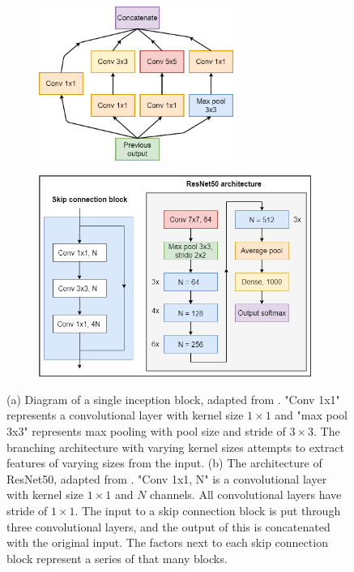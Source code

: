 \documentclass[12pt]{article}
\begin{document}
\begin{figure}[!h]
\centering
\begin{subfigure}{0.5\textwidth}
	\centering
	\hspace{-1cm}\includegraphics[width=2.5in]{images/inception_block.png}
	\caption{}
	\label{arch:inc}
\end{subfigure}%
\begin{subfigure}{0.5\textwidth}
	\centering
	\hspace{-1cm}\includegraphics[width=3.5in]{images/resnet50.png}
	\caption{}
	\label{arch:res}
\end{subfigure}
\caption{(a) Diagram of a single inception block, adapted from \cite{Szegedy15}. "Conv 		1x1" represents a convolutional layer with kernel size $1\times1$ and "max pool 3x3" represents max pooling with pool size and stride of $3\times3$. The branching architecture with varying kernel sizes attempts to extract features of varying sizes from the input. 
(b) The architecture of ResNet50, adapted from \cite{He15}. "Conv 1x1, N" is a convolutional layer with kernel size $1\times1$ and $N$ channels. All convolutional layers have stride of $1\times1$. The input to a skip connection block is put through three convolutional layers, and the output of this is concatenated with the original input. The factors next to each skip connection block represent a series of that many blocks.}
\label{arch:arch}
\end{figure}
\end{document}
